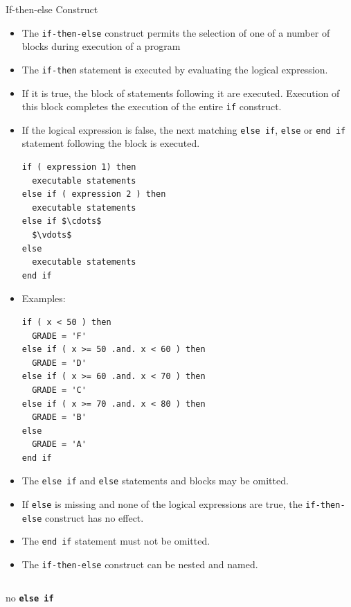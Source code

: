 \documentclass[c,mathserif,compress,xcolor=svgnames]{beamer}
\newcommand{\bftt}[1]{\textbf{\texttt{#1}}}
\newcommand{\lstfortran}[1]{\lstinline[language={[90]Fortran},basicstyle=\footnotesize\ttfamily]|#1|}
\begin{document}
\begin{frame}{If-then-else Construct}
  \begin{itemize}
    \item The \lstfortran{if-then-else} construct permits the selection of one of a number of blocks during execution of a program
    \item The \lstfortran{if-then} statement is executed by evaluating the logical expression.
    \item If it is true, the block of statements following it are executed. Execution of this block completes the execution of the entire \lstfortran{if} construct.
    \item If the logical expression is false, the next matching \lstfortran{else if}, \lstfortran{else} or \lstfortran{end if} statement following the block is executed.
      \begin{lstlisting}[language={[90]Fortran},mathescape,basicstyle=\fontsize{6}{5}\selectfont\ttfamily]
if ( expression 1) then
  executable statements
else if ( expression 2 ) then
  executable statements
else if $\cdots$
  $\vdots$
else
  executable statements
end if
      \end{lstlisting}
    \item Examples:
      \begin{lstlisting}[language={[90]Fortran},basicstyle=\fontsize{6}{5}\selectfont\ttfamily]
if ( x < 50 ) then
  GRADE = 'F'
else if ( x >= 50 .and. x < 60 ) then
  GRADE = 'D'
else if ( x >= 60 .and. x < 70 ) then
  GRADE = 'C'
else if ( x >= 70 .and. x < 80 ) then
  GRADE = 'B'
else 
  GRADE = 'A'
end if
      \end{lstlisting}
    \item The \lstfortran{else if} and \lstfortran{else} statements and blocks may be omitted.
    \item If \lstfortran{else} is missing and none of the logical expressions are true, the \lstfortran{if-then-else} construct has no effect.
    \item The \lstfortran{end if} statement must not be omitted.
    \item The \lstfortran{if-then-else} construct can be nested and named.
  \end{itemize}
  \framebreak
  \begin{columns}
    \column{6cm}
    \begin{block}{\scriptsize no \bftt{else if}}
      \begin{lstlisting}[language={[90]Fortran},basicstyle=\fontsize{6}{5}\selectfont\ttfamily]

\end{lstlisting}
\end{block}
\end{columns}
\end{frame}
\end{document}
